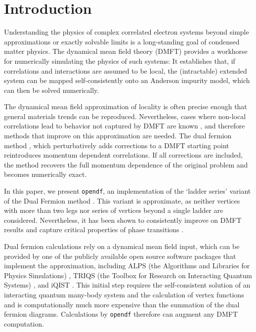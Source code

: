 \documentclass[3p,times,procedia]{elsarticle}
\begin{document}
\vspace*{-8pt}

\section{Introduction}

Understanding the physics of complex correlated electron systems beyond simple approximations or exactly solvable limits is a long-standing goal of condensed matter physics. The dynamical mean field theory (DMFT) \cite{MetznerVollhardt:1989,MH89,Georges92,Jarrell92,Georges1996,KotliarSavrasov:2006} provides a workhorse for numerically simulating the physics of such systems: It establishes that, if correlations and interactions are assumed to be local, the (intractable) extended system can be mapped self-consistently onto an  Anderson impurity model, which can then be solved numerically.

The dynamical mean field approximation of locality is often precise enough that general materials trends can be reproduced. Nevertheless, cases where non-local correlations lead to behavior not captured by DMFT are known \cite{Lichtenstein2000,MaierJarrell:2005,Held2008,Fuchs2011}, and therefore methods that improve on this approximation are needed. The dual fermion method \cite{Rubtsov2008}, which perturbatively adds corrections to a DMFT starting point reintroduces momentum dependent correlations. If all corrections are included, the method recovers the full momentum dependence of the original problem and becomes numerically exact.

In this paper, we present \texttt{opendf}, an implementation of the `ladder series' variant of the Dual Fermion method \cite{HafermannLi:2009}. This variant is approximate, as neither vertices with more than two legs nor series of vertices beyond a single ladder are considered. Nevertheless, it has been shown to consistently improve on DMFT results \cite{Rubtsov2008,Brener2008,HafermannLi:2009,AntipovRubtsov:2011,Li2014,Otsuki2014} and capture critical properties of phase transitions \cite{Antipov2014}.

Dual fermion calculations rely on a dynamical mean field input, which can be provided by one of the publicly available open source software packages that implement the approximation, including ALPS (the Algorithms and Libraries for Physics Simulations) \cite{ALPS2}, TRIQS (the Toolbox for Research on Interacting Quantum Systems) \cite{TRIQS}, and iQIST \cite{iQIST}.
This initial step requires the self-consistent solution of an interacting quantum many-body system and the calculation of vertex functions \cite{Hafermann2013a,Gull2008b} and is computationally much more expensive than the summation of the dual fermion diagrams. Calculations by \texttt{opendf} therefore can augment any DMFT computation. 
\end{document}
